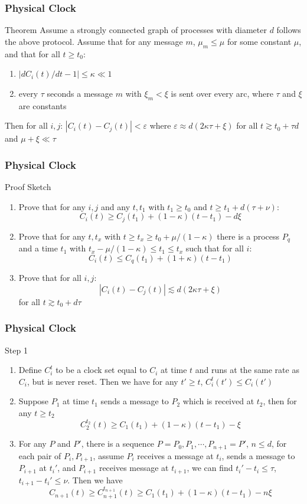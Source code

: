\documentclass{beamer}
\begin{document}
\frame
{
  \frametitle{Physical Clock}
  \begin{block}{Theorem}
  Assume a strongly connected graph of processes with diameter $d$ follows the above protocol. Assume that for any message $m$, $\mu_m\leq\mu$ for some constant $\mu$, and that for all $t\geq t_0$:
  \begin{enumerate}
  	\item $|dC_i(t)/dt-1|\leq\kappa\ll 1$
  	\item every $\tau$ seconds a message $m$ with $\xi_m<\xi$ is sent over every arc, where $\tau$ and $\xi$ are constants
  \end{enumerate}
  Then for all $i,j$: $|C_i(t)-C_j(t)|<\varepsilon$ where $\varepsilon\approx d(2\kappa\tau+\xi)$ for all $t\gtrsim t_0+\tau d$ and $\mu+\xi\ll\tau$
  \end{block}
}

\frame
{
  \frametitle{Physical Clock}
  \begin{block}{Proof Sketch}
  \begin{enumerate}
  	\item<2-> Prove that for any $i,j$ and any $t,t_1$ with $t_1\geq t_0$ and $t\geq t_1+d(\tau+\nu)$:
  	\[C_i(t)\geq C_j(t_1)+(1-\kappa)(t-t_1)-d\xi\]
  	\item<3-> Prove that for any $t,t_x$ with $t\geq t_x\geq t_0+\mu/(1-\kappa)$ there is a process $P_q$ and a time $t_1$ with $t_x-\mu/(1-\kappa)\leq t_1\leq t_x$ such that for all $i$:
  	\[C_i(t)\leq C_q(t_1)+(1+\kappa)(t-t_1)\]
  	\item<4-> Prove that for all $i,j$:
  	\[|C_i(t)-C_j(t)|\lesssim d(2\kappa\tau+\xi)\]
  	for all $t\gtrsim t_0+d\tau$
  \end{enumerate}
  \end{block}
}

\frame
{
  \frametitle{Physical Clock}
  \begin{block}{Step 1}
  \begin{enumerate}
  	\item<1-> Define $C_i^t$ to be a clock set equal to $C_i$ at time $t$ and runs at the same rate as $C_i$, but is never reset. Then we have for any $t'\geq t$, $C_i^t(t')\leq C_i(t')$
  	\item<2-> Suppose $P_1$ at time $t_1$ sends a message to $P_2$ which is received at $t_2$, then for any $t\geq t_2$
  	\[C_2^{t_2}(t)\geq C_1(t_1)+(1-\kappa)(t-t_1)-\xi\]
  	\item<3-> For any $P$ and $P'$, there is a sequence $P=P_0,P_1,\cdots,P_{n+1}=P'$, $n\leq d$, for each pair of $P_i,P_{i+1}$, assume $P_i$ receives a message at $t_i$, sends a message to $P_{i+1}$ at $t_i'$, and $P_{i+1}$ receives message at $t_{i+1}$, we can find $t_i'-t_i\leq\tau$, $t_{i+1}-t_i'\leq\nu$. Then we have
  	\[C_{n+1}(t)\geq C_{n+1}^{t_{n+1}}(t) \geq C_1(t_1)+(1-\kappa)(t-t_1)-n\xi\]
  \end{enumerate}
  \end{block}
}
\end{document}

